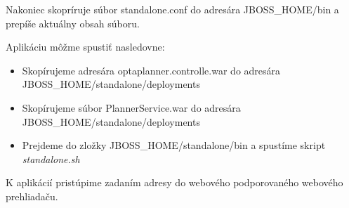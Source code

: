 {	Nakoniec skopríruje súbor standalone.conf do adresára JBOSS\_HOME/bin a prepíše aktuálny obsah súboru.

	Aplikáciu môžme spustiť nasledovne:
	\begin{itemize}
	\item Skopírujeme adresára optaplanner.controlle.war do adresára \\ JBOSS\_HOME/standalone/deployments
	\item Skopírujeme súbor PlannerService.war do adresára \\ JBOSS\_HOME/standalone/deployments
	\item Prejdeme do zložky JBOSS\_HOME/standalone/bin a spustíme skript \emph{standalone.sh}
	\end{itemize}
	
	K aplikácií pristúpime zadaním adresy  do webového podporovaného webového prehliadaču.


}

